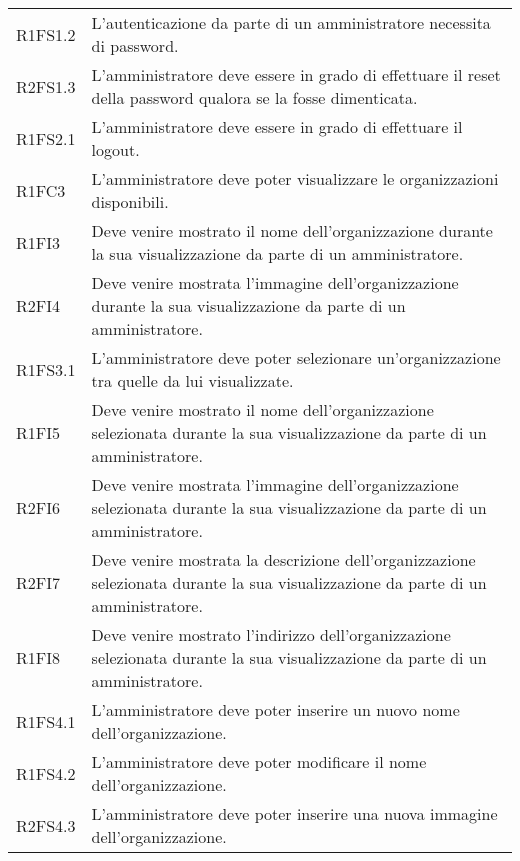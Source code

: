 {\begin{longtable}{ >{\centering}p{} >{}p{}}
R1FS1.2 & L’autenticazione da parte di un amministratore necessita di password.\\

R2FS1.3 & L'amministratore deve essere in grado di effettuare il reset della password qualora se la fosse dimenticata.\\

R1FS2.1 & L'amministratore deve essere in grado di effettuare il logout.\\

R1FC3 & L'amministratore deve poter visualizzare le organizzazioni disponibili.\\

R1FI3 & Deve venire mostrato il nome dell'organizzazione durante la sua visualizzazione da parte di un amministratore. \\

R2FI4 & Deve venire mostrata l'immagine dell'organizzazione durante la sua visualizzazione da parte di un amministratore. \\

R1FS3.1 & L'amministratore deve poter selezionare un'organizzazione tra quelle da lui visualizzate. \\

R1FI5 & Deve venire mostrato il nome dell'organizzazione selezionata durante la sua visualizzazione da parte di un amministratore.\\

R2FI6 & Deve venire mostrata l'immagine dell'organizzazione selezionata durante la sua visualizzazione da parte di un amministratore. \\

R2FI7 & Deve venire mostrata la descrizione dell'organizzazione selezionata durante la sua visualizzazione da parte di un amministratore.\\

R1FI8 & Deve venire mostrato l'indirizzo dell'organizzazione selezionata durante la sua visualizzazione da parte di un amministratore. \\

R1FS4.1 & L'amministratore deve poter inserire un nuovo nome dell'organizzazione.\\

R1FS4.2 & L'amministratore deve poter modificare il nome dell'organizzazione.\\

R2FS4.3 & L'amministratore deve poter inserire una nuova immagine dell'organizzazione.\\


\end{longtable}}
